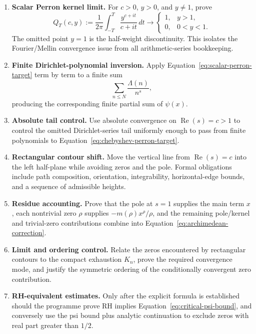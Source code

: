 \documentclass[11pt,a4paper]{article}
\newcommand{\RePart}{\operatorname{Re}}
\begin{document}
\begin{enumerate}
  \item \textbf{Scalar Perron kernel limit.} For $c>0$, $y>0$, and $y\neq1$,
  prove
  \begin{equation}
    Q_T(c,y):=\frac{1}{2\pi}\int_{-T}^{T}
      \frac{y^{c+it}}{c+it}\,dt
    \longrightarrow
    \begin{cases}
      1,&y>1,\\
      0,&0<y<1.
    \end{cases}
    \label{eq:scalar-perron-target}
  \end{equation}
  The omitted point $y=1$ is the half-weight discontinuity. This isolates the
  Fourier/Mellin convergence issue from all arithmetic-series bookkeeping.

  \item \textbf{Finite Dirichlet-polynomial inversion.} Apply
  Equation~\eqref{eq:scalar-perron-target} term by term to a finite sum
  \[
    \sum_{n\leq N}\frac{\Lambda(n)}{n^s},
  \]
  producing the corresponding finite partial sum of $\psi(x)$.

  \item \textbf{Absolute tail control.} Use absolute convergence on
  $\RePart(s)=c>1$ to control the omitted Dirichlet-series tail uniformly
  enough to pass from finite polynomials to
  Equation~\eqref{eq:chebyshev-perron-target}.

  \item \textbf{Rectangular contour shift.} Move the vertical line from
  $\RePart(s)=c$ into the left half-plane while avoiding zeros and the pole.
  Formal obligations include path composition, orientation, integrability,
  horizontal-edge bounds, and a sequence of admissible heights.

  \item \textbf{Residue accounting.} Prove that the pole at $s=1$ supplies the
  main term $x$, each nontrivial zero $\rho$ supplies
  $-m(\rho)x^{\rho}/\rho$, and the remaining pole/kernel and trivial-zero
  contributions combine into Equation~\eqref{eq:archimedean-correction}.

  \item \textbf{Limit and ordering control.} Relate the zeros encountered by
  rectangular contours to the compact exhaustion $K_n$, prove the required
  convergence mode, and justify the symmetric ordering of the conditionally
  convergent zero contribution.

  \item \textbf{RH-equivalent estimates.} Only after the explicit formula is
  established should the programme prove RH implies
  Equation~\eqref{eq:critical-psi-bound}, and conversely use the psi bound plus
  analytic continuation to exclude zeros with real part greater than $1/2$.
\end{enumerate}
\end{document}
